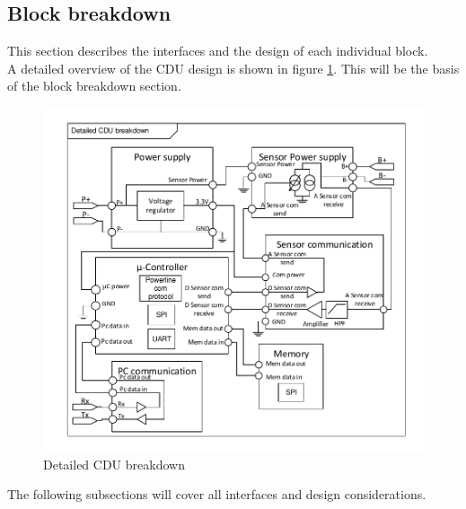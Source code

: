 \subsection{Block breakdown}
This section describes the interfaces and the design of each individual block.\\
A detailed overview of the CDU design is shown in figure \ref{fig:detailedCDU}. This will be the basis of the block breakdown section.
\begin{figure}[H]
	\centering
	\includegraphics[width=1\textwidth]{billeder/detailedCDU}
	\caption{Detailed CDU breakdown}
	\label{fig:detailedCDU}
\end{figure}

The following subsections will cover all interfaces and design considerations.
